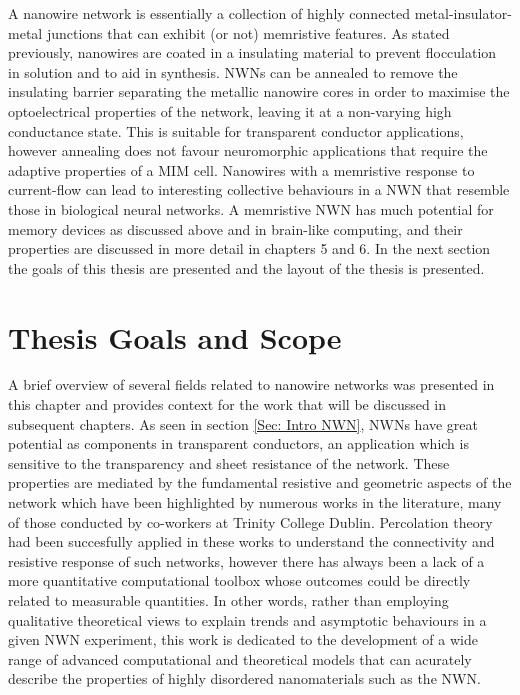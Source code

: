 A nanowire network is essentially a collection of highly connected metal-insulator-metal junctions that can exhibit (or not) memristive features. As stated previously, nanowires are coated in a insulating material to prevent flocculation in solution and to aid in synthesis\cite{shah2004}. NWNs can be annealed to remove the insulating barrier separating the metallic nanowire cores in order to maximise the optoelectrical properties of the network, leaving it at a non-varying high conductance state\cite{bellew2015,rocha2015}. This is suitable for transparent conductor applications, however annealing does not favour neuromorphic applications that require the adaptive properties of a MIM cell. Nanowires with a memristive response to current-flow can lead to interesting collective behaviours in a NWN that resemble those in biological neural networks. A memristive NWN has much potential for memory devices as discussed above and in brain-like computing, and their properties are discussed in more detail in chapters 5 and 6. In the next section the goals of this thesis are presented and the layout of the thesis is presented.
\section{Thesis Goals and Scope}
\label{Sec: Intro Conclusion}
A brief overview of several fields related to nanowire networks was presented in this chapter and provides context for the work that will be discussed in subsequent chapters. As seen in section \ref{Sec: Intro NWN}, NWNs have great potential as components in transparent conductors, an application which is sensitive to the transparency and sheet resistance of the network. These properties are mediated by the fundamental resistive and geometric aspects of the network which have been highlighted by numerous works in the literature, many of those conducted by co-workers at Trinity College Dublin\cite{de2011,lyons2011,de2009,bellew2015,lyons2008}. Percolation theory had been succesfully applied in these works to understand the connectivity and resistive response of such networks, however there has always been a lack of a more quantitative computational toolbox whose outcomes could be directly related to measurable quantities. In other words, rather than employing qualitative theoretical views to explain trends and asymptotic behaviours in a given NWN experiment, this work is dedicated to the development of a wide range of advanced computational and theoretical models that can acurately describe the properties of highly disordered nanomaterials such as the NWN. 

